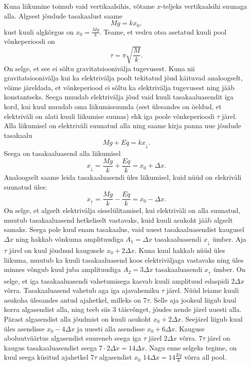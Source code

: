 \documentclass[11pt]{article}
\begin{document}
{{\ifSolution
Kuna liikumine toimub vaid vertikaalsihis, võtame $x$-teljeks vertikaalsihi suunaga alla. Algsest jõudude tasakaalust saame
$$Mg = kx_0,$$
kust kuuli algkõrgus on $x_0 = \frac{Mg}{k}$. Teame, et vedru otsa asetatud kuuli pool võnkeperioodi on 
$$\tau = \pi \sqrt{\frac{M}{k}}.$$
On selge, et see ei sõltu gravitatsioonivälja tugevusest. Kuna nii gravitatsioonivälja kui ka elektrivälja poolt tekitatud jõud käituvad analoogselt, võime järeldada, et võnkeperiood ei sõltu ka elektrivälja tugevusest ning jääb konstantseks. Seega muudab elektrivälja jõud vaid kuuli tasakaaluasendit iga kord, kui kuul muudab oma liikumissuunda (sest ülesandes on öeldud, et elektriväli on alati kuuli liikumise suunas) ehk iga poole võnkeperioodi $\tau$ järel. Alla liikumisel on elektriväli suunatud alla ning saame kirja panna uue jõudude tasakaalu
$$Mg + Eq = kx_\downarrow.$$
Seega on tasakaaluasend alla liikumisel
$$x_\downarrow = \frac{Mg}{k} + \frac{Eq}{k} = x_0 + \Delta x.$$
Analoogselt saame leida tasakaaluasendi üles liikumisel, kuid nüüd on elekriväli suunatud üles:
$$x_\uparrow = \frac{Mg}{k} - \frac{Eq}{k} = x_0 - \Delta x.$$
On selge, et algselt elektrivälja sisselülitamisel, kui elektriväli on alla suunatud, muutub tasakaaluasend hetkeliselt vastavaks, kuid kuuli asukoht jääb algselt samaks. Seega pole kuul enam tasakaalus, vaid uuest tasakaaluasendist kaugusel $\Delta x$ ning hakkab võnkuma amplituudiga $A_1 = \Delta x$ tasakaaluasendi $x_\downarrow$ ümber. Aja $\tau$ järel on kuul jõudnud kaugusele $x_0 + 2\Delta x$. Kuna kuul hakkab nüüd üles liikuma, muutub ka kuuli tasakaaluasend koos elektriväljaga vastavaks ning üles minnes võngub kuul juba amplituudiga $A_2 = 3 \Delta x$ tasakaaluasendi $x_\uparrow$ ümber.
On selge, et iga tasakaaluasendi vahetumisega kasvab kuuli amplituud edaspidi $2 \Delta x$ võrra. Tasakaaluasend vahetub aga iga ajavahemiku $\tau$ järel.
Nüüd leiame kuuli asukoha ülesandes antud ajahetkel, milleks on $7 \tau$. Selle aja jooksul liigub kuul korra algasendist alla, ning teeb siis $3$ täisvõnget, jõudes nende järel uuesti alla. Pärast algasendist alla jõudmist on kuuli asukoht $x_0 + 2 \Delta x $. Seejärel liigub kuul üles asendisse $x_0 - 4 \Delta x$ ja uuesti alla asendisse $x_0 + 6 \Delta x$. Kauguse aboluutväärtus algasendist suureneb seega iga $\tau$ järel $2 \Delta x$ võrra. $7 \tau$ järel on kaugus tasakaaluasendist seega $7 \cdot 2 \Delta x = 14 \Delta x$.
Nagu enne selgeks tegime, on kuul seega küsitud ajahetkel $7 \tau$ algasendist $x_0$ $14 \Delta x = 14 \frac{Eq}{k}$ võrra all pool.
\fi
}

}
\end{document}
